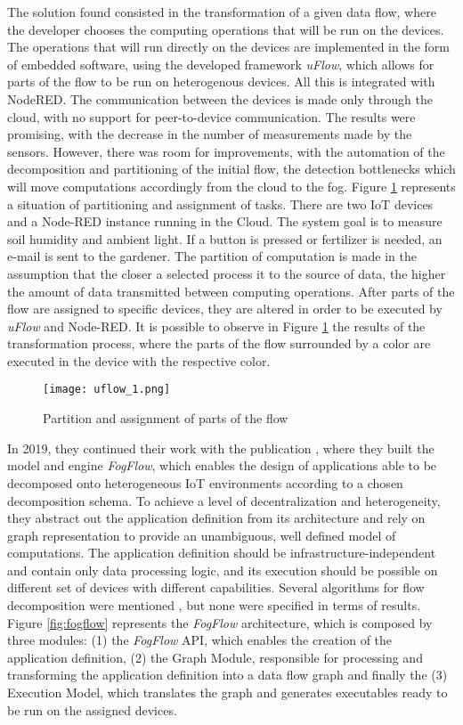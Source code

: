 The solution found consisted in the transformation of a given data flow, where the developer chooses the computing operations that will be run on the devices. The operations that will run directly on the devices are implemented in the form of embedded software, using the developed framework \textit{uFlow}, which allows for parts of the flow to be run on heterogenous devices. All this is integrated with NodeRED. The communication between the devices is made only through the cloud, with no support for peer-to-device communication. The results were promising, with the decrease in the number of measurements made by the sensors. However, there was room for improvements, with the automation of the decomposition and partitioning of the initial flow, the detection bottlenecks which will move computations accordingly from the cloud to the fog. Figure \ref{fig:uflow_1} represents a situation of partitioning and assignment of tasks. There are two IoT devices and a Node-RED instance running in the Cloud. The system goal is to measure soil humidity and ambient light. If a button is pressed or fertilizer is needed, an e-mail is sent to the gardener. The partition of computation is made in the assumption that the closer a selected process it to the source of data, the higher the amount of data transmitted between computing operations. After parts of the flow are assigned to specific devices, they are altered in order to be executed by \textit{uFlow} and Node-RED. It is possible to observe in Figure \ref{fig:uflow_1} the results of the transformation process, where the parts of the flow surrounded by a color are executed in the device with the respective color.

\begin{figure}[h]
\caption{Partition and assignment of parts of the flow \cite{flow_based_programming_fog}}
\label{fig:uflow_1}
\centering
\texttt{[image: uflow\_1.png]}
\end{figure}

In 2019, they continued their work with the publication \cite{fog_flow}, where they built the model and engine \textit{FogFlow}, which enables the design of applications able to be decomposed onto heterogeneous IoT environments according to a chosen decomposition schema. To achieve a level of decentralization and heterogeneity, they abstract out the application definition from its architecture and rely on graph representation to provide an unambiguous, well defined model of computations. The application definition should be infrastructure-independent and contain only data processing logic, and its execution should be possible on different set of devices with different capabilities. Several algorithms for flow decomposition were mentioned \cite{algorithm_fog} \cite{ifogsim}, but none were specified in terms of results. Figure \ref{fig:fogflow} represents the \textit{FogFlow} architecture, which is composed by three modules: (1) the \textit{FogFlow} API, which enables the creation of the application definition, (2) the Graph Module, responsible for processing and transforming the application definition into a data flow graph and finally the (3) Execution Model, which translates the graph and generates executables ready to be run on the assigned devices.

